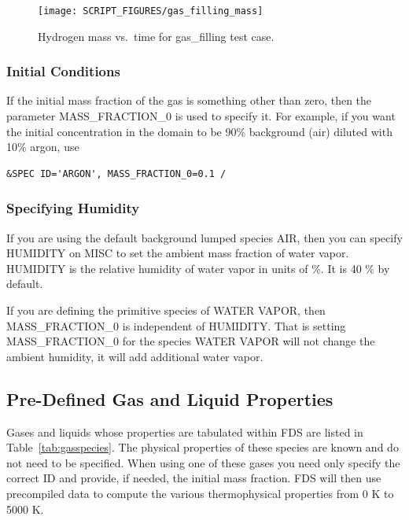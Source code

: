 \documentclass[11pt]{book}
\begin{document}
\begin{figure}[ht]
\begin{center}
\texttt{[image: SCRIPT\_FIGURES/gas\_filling\_mass]}
\end{center}
\caption[Results of the {\ct gas\_filling} test case]{Hydrogen mass vs.~time for {\ct gas\_filling} test case.}
\label{gas_filling_fig}
\end{figure}

\subsubsection{Initial Conditions}

If the initial mass fraction of the gas is something other than zero, then the parameter {\ct MASS\_FRACTION\_0} is used to specify it. For example, if you want the initial concentration in the domain to be 90\% background (air) diluted with 10\% argon, use

\begin{lstlisting}
&SPEC ID='ARGON', MASS_FRACTION_0=0.1 /
\end{lstlisting}

\subsubsection{Specifying Humidity}
\label{info:humidity}

If you are using the default background lumped species {\ct AIR}, then you can specify {\ct HUMIDITY} on {\ct MISC} to set the ambient mass fraction of water vapor. {\ct HUMIDITY} is the relative humidity of water vapor in units of \%. It is 40 \% by default.

If you are defining the primitive species of {\ct WATER VAPOR}, then {\ct MASS\_FRACTION\_0} is independent of {\ct HUMIDITY}.  That is setting {\ct MASS\_FRACTION\_0} for the species {\ct WATER VAPOR} will not change the ambient humidity, it will add additional water vapor.

\subsection{Pre-Defined Gas and Liquid Properties}
\label{gas_species_props}

Gases and liquids whose properties are tabulated within FDS are listed in Table~\ref{tab:gasspecies}. The physical properties of these species are known and do not need to be specified. When using one of these gases you need only specify the correct {\ct ID} and provide, if needed, the initial mass fraction. FDS will then use precompiled data to compute the various thermophysical properties from 0 K to 5000 K.
\end{document}
